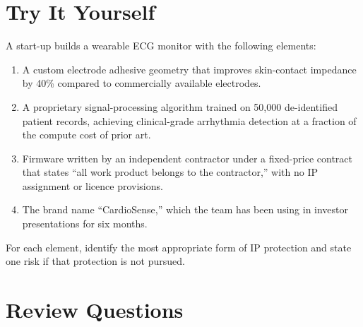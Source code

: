 \section*{Try It Yourself}
\label{sec:ch15-try}

A start-up builds a wearable ECG monitor with the following elements:
\begin{enumerate}
  \item[(a)] A custom electrode adhesive geometry that improves skin-contact
             impedance by 40\% compared to commercially available electrodes.
  \item[(b)] A proprietary signal-processing algorithm trained on 50,000
             de-identified patient records, achieving clinical-grade arrhythmia
             detection at a fraction of the compute cost of prior art.
  \item[(c)] Firmware written by an independent contractor under a fixed-price
             contract that states ``all work product belongs to the contractor,''
             with no IP assignment or licence provisions.
  \item[(d)] The brand name ``CardioSense,'' which the team has been using in
             investor presentations for six months.
\end{enumerate}

For each element, identify the most appropriate form of IP protection and state
one risk if that protection is not pursued.

\section*{Review Questions}
\label{sec:ch15-review}

